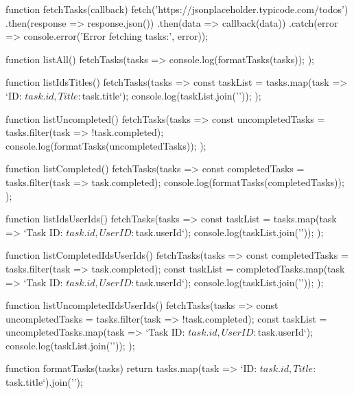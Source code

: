 function fetchTasks(callback) {
    fetch('https://jsonplaceholder.typicode.com/todos')
      .then(response => response.json())
      .then(data => callback(data))
      .catch(error => console.error('Error fetching tasks:', error));
  }
  
  function listAll() {
    fetchTasks(tasks => {
      console.log(formatTasks(tasks));
    });
  }
  
  function listIdsTitles() {
    fetchTasks(tasks => {
      const taskList = tasks.map(task => `ID: ${task.id}, Title: ${task.title}`);
      console.log(taskList.join('\n'));
    });
  }
  
  function listUncompleted() {
    fetchTasks(tasks => {
      const uncompletedTasks = tasks.filter(task => !task.completed);
      console.log(formatTasks(uncompletedTasks));
    });
  }
  
  function listCompleted() {
    fetchTasks(tasks => {
      const completedTasks = tasks.filter(task => task.completed);
      console.log(formatTasks(completedTasks));
    });
  }
  
  function listIdsUserIds() {
    fetchTasks(tasks => {
      const taskList = tasks.map(task => `Task ID: ${task.id}, User ID: ${task.userId}`);
      console.log(taskList.join('\n'));
    });
  }
  
  function listCompletedIdsUserIds() {
    fetchTasks(tasks => {
      const completedTasks = tasks.filter(task => task.completed);
      const taskList = completedTasks.map(task => `Task ID: ${task.id}, User ID: ${task.userId}`);
      console.log(taskList.join('\n'));
    });
  }
  
  function listUncompletedIdsUserIds() {
    fetchTasks(tasks => {
      const uncompletedTasks = tasks.filter(task => !task.completed);
      const taskList = uncompletedTasks.map(task => `Task ID: ${task.id}, User ID: ${task.userId}`);
      console.log(taskList.join('\n'));
    });
  }
  
  function formatTasks(tasks) {
    return tasks.map(task => `ID: ${task.id}, Title: ${task.title}`).join('\n');
  }
  